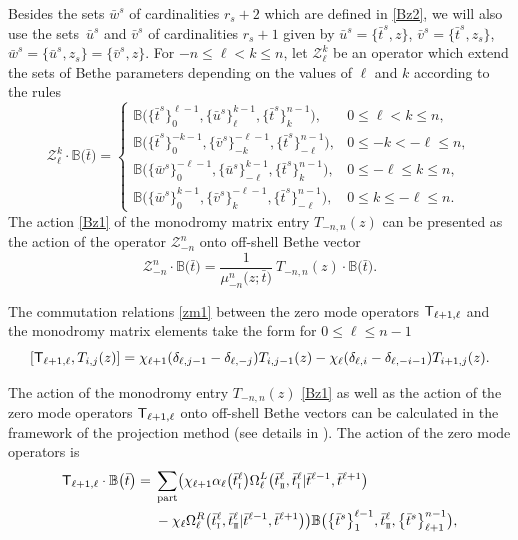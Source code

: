 \documentclass[10pt,a4paper]{amsart}
\newcommand{\so}{\scriptscriptstyle \rm I}
\newcommand{\st}{\scriptscriptstyle \rm I\hspace{-1pt}I}
\newcommand{\bu}{\bar u}
\newcommand{\bv}{\bar v}
\newcommand{\bt}{{\bar t}}
\newcommand{\bw}{\bar w}
\theoremstyle{definition}
\def\BB{{\mathbb{B}}}
\def\r#1{\eqref{#1}}
\def\sT{{\sf T}}
\def\vk{\chi}
\def\Z{\mathcal{Z}}
\def\Oml{\Omega^L}
\def\Omr{\Omega^R}
\begin{document}
Besides the sets $\bw^s$ of cardinalities $r_s+2$ which are defined in \r{Bz2},
we will also use the sets~$\bu^s$ and $\bv^s$ of cardinalities $r_s+1$ given by
$
\bu^s=\bigl\{\bt^s,z\bigr\}$, $ \bv^s=\bigl\{\bt^s,z_s\bigr\}$, $ \bw^s=\bigl\{\bu^s,z_s\bigr\}=\bigl\{\bv^s,z\bigr\}$.
For $-n\leq \ell<k\leq n$, let $\Z_\ell^k$ be an operator which extend the sets of
 Bethe parameters depending on the values of $\ell$ and $k$ according to the
rules
\[%
\Z_\ell^k\cdot\BB\bigl(\bt\bigr)=\begin{cases}
\BB\bigl(\bigl\{\bt^s\bigr\}_0^{\ell-1},\bigl\{\bu^s\bigr\}_\ell^{k-1},\bigl\{\bt^s\bigr\}_k^{n-1}\bigr),&  0\leq \ell<k\leq n,\\[1mm]
\BB\bigl(\bigl\{\bt^s\bigr\}_0^{-k-1},\bigl\{\bv^s\bigr\}_{-k}^{-\ell-1},\bigl\{\bt^s\bigr\}_{-\ell}^{n-1}\bigr),&  0\leq -k<-\ell\leq n,\\[1mm]
\BB\bigl(\bigl\{\bw^s\bigr\}_0^{-\ell-1},\bigl\{\bu^s\bigr\}_{-\ell}^{k-1},\bigl\{\bt^s\bigr\}_{k}^{n-1}\bigr),& 0\leq -\ell\leq k\leq n,\\[1mm]
\BB\bigl(\bigl\{\bw^s\bigr\}_0^{k-1},\bigl\{\bv^s\bigr\}_{k}^{-\ell-1},\bigl\{\bt^s\bigr\}_{-\ell}^{n-1}\bigr),&  0\leq k\leq- \ell\leq n.
\end{cases}
\]
The action \r{Bz1} of the monodromy matrix entry $T_{-n,n}(z)$
 can be presented as the action
of the operator $\Z_{-n}^n$ onto off-shell Bethe vector
\begin{equation}\label{Bz6}
\Z_{-n}^n\cdot \BB\bigl(\bt\bigr)=
\frac{1}{\mu_{-n}^n\bigl(z;\bt\bigr)}\ T_{-n,n}(z)\cdot\BB\bigl(\bt\bigr) .
\end{equation}

The commutation relations \r{zm1} between the zero mode operators $\sT_{\ell+1,\ell}$ and the
monodromy matrix elements take the form for $0\leq \ell\leq n-1$
\begin{equation}\label{Bz0}
[\sT_{\ell+1,\ell} ,T_{i,j}(z)]=\vk_{\ell+1}
(\delta_{\ell,j-1}-\delta_{\ell,-j}) T_{i,j-1}(z)
-\vk_\ell(\delta_{\ell,i}-\delta_{\ell,-i-1}) T_{i+1,j}(z) .
\end{equation}

The action of the monodromy entry $T_{-n,n}(z)$ \r{Bz1}
as well as the action of the zero mode operators $\sT_{\ell+1,\ell}$
onto off-shell Bethe vectors can be calculated in the framework
 of the projection method (see details in \cite[Section~4.1]{LP2}).
The action of the zero mode operators is{\samepage
\begin{align}
\sT_{\ell+1,\ell}\cdot\BB\bigl(\bt\bigr)={}&\sum_{\rm part}\bigl(\vk_{\ell+1}
\alpha_\ell\bigl(\bt^\ell_{\so}\bigr) \Oml_\ell\bigl(\bt^\ell_{\st},\bt^\ell_{\so}|
\bt^{\ell-1},\bt^{\ell+1}\bigr)\nonumber\\
&- \vk_\ell \Omr_\ell\bigl(\bt^\ell_{\so},\bt^\ell_{\st}|\bt^{\ell-1},\bt^{\ell+1}\bigr)\bigr)
\BB\bigl(\bigl\{\bt^s\bigr\}_1^{\ell-1},\bt^\ell_{\st},\bigl\{\bt^s\bigr\}_{\ell+1}^{n-1}\bigr) ,\label{Bz8}
\end{align}}%
\end{document}
